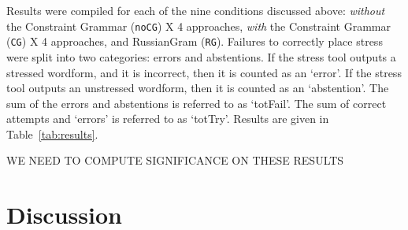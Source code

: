 \documentclass[11pt]{article}
\begin{document}
Results were compiled for each of the nine conditions discussed above: 
\emph{without} the Constraint Grammar ({\small {\tt noCG}}) X 4 approaches, 
\emph{with} the Constraint Grammar ({\small {\tt CG}}) X 4 approaches, 
and RussianGram ({\small {\tt RG}}). 
Failures to correctly place stress were split into two categories: errors and abstentions. 
If the stress tool outputs a stressed wordform, and it is incorrect, then it is
counted as an `error'. If the stress tool outputs an unstressed wordform, then
it is counted as an `abstention'. The sum of the errors and abstentions is referred
to as `totFail'. The sum of correct attempts and `errors' is referred to as `totTry'.
Results are given in Table~\ref{tab:results}.
 
WE NEED TO COMPUTE SIGNIFICANCE ON THESE RESULTS

\section{Discussion}





%



\end{document}

